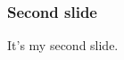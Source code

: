 \documentclass{beamer}
\begin{document}
 

% 










% 



% 



\begin{frame} \transwipe[direction=90] 


\frametitle{Second slide} 

It’s my second slide. 

\end{frame}

% 



% 


% 
\end{document}
